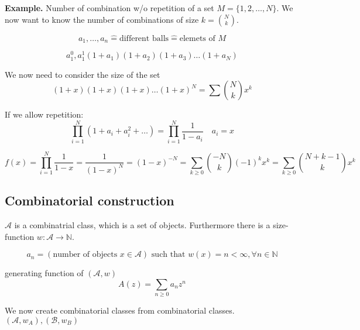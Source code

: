 \textbf{Example.} 
Number of combination w/o repetition of a set $M = \{1,2, \ldots ,N\}$. We now want to know the number of combinations of size $k = {N \choose k}$.

\[
    a_1, \ldots , a_n \mathrel{\hat{=}} \text{different balls} \mathrel{\hat{=}} \text{elemets of } M
\]

\[
    a_1^0, a_1^1 
    (1+a_1)(1+a_2)(1+a_3) \ldots (1+a_N)
\]

We now need to consider the size of the set
\[
    (1+x)(1+x)(1+x) \ldots (1+x)^N = \sum {N \choose k} x^k
\]

If we allow repetition: 
\[
    \prod _{i=1}^N (1+a_i + a_i^2 + \ldots) = \prod _{i=1}^N \frac{1}{1-a_i} \quad a_i = x
\]

\[
    f(x) = \prod _{i=1}^N \frac{1}{1-x} = \frac{1}{(1-x)^N} 
    = (1-x)^{-N} 
    = \sum _{k \geq 0} {-N \choose k} (-1)^k x^k
    = \sum _{k \geq 0} {N + k-1 \choose k} x^k
\]

\subsection{Combinatorial construction}
$\mathcal{A}$ is a combinatrial class, which is a set of objects. 
Furthermore there is a size-function $w: \mathcal{A} \rightarrow \mathbb{N}$. 

\[
a_n = \left(\text{number of objects } x\in \mathcal{A}\right) \text{ such that }w(x) = n < \infty,  \forall n \in \mathbb{N}
\]

generating function of $(\mathcal{A}, w)$ 
\[
    A(z) = \sum_{n\geq 0 } a_n z^n
\]

We now create combinatorial classes from combinatorial classes.
$(\mathcal{A}, w_A) , (\mathcal{B}, w_B)$

